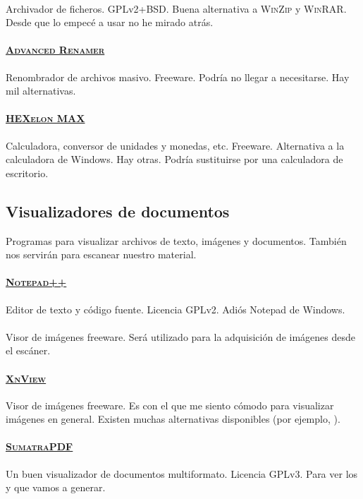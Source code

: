 \documentclass[%
	a5paper,
	10pt,
	twoside,
	openright,
	final,
]{memoir}
\begin{document}
	\paragraph{\href{https://www.7-zip.org}{\szip}} Archivador de ficheros. GPLv2+BSD. Buena alternativa a \textsc{WinZip} y \textsc{WinRAR}. Desde que lo empecé a usar no he mirado atrás.
	\paragraph{\href{https://www.advancedrenamer.com}{\textsc{Advanced Renamer}}} Renombrador de archivos masivo. Freeware. Podría no llegar a necesitarse. Hay mil alternativas.
	\paragraph{\href{https://www.hexelon.com/en}{\textsc{HEXelon MAX}}} Calculadora, conversor de unidades y monedas, etc. Freeware. Alternativa a la calculadora de Windows. Hay otras. Podría sustituirse por una calculadora de escritorio.

	\subsection{Visualizadores de documentos} Programas para visualizar archivos de texto, imágenes y documentos. También nos servirán para escanear nuestro material.
	\paragraph{\href{https://notepad-plus-plus.org}{\textsc{Notepad++}}} Editor de texto y código fuente. Licencia GPLv2. Adiós Notepad de Windows.
	\paragraph{\href{https://www.irfanview.com}{\irfanview}} Visor de imágenes freeware. Será utilizado para la adquisición de imágenes desde el escáner.
	\paragraph{\href{https://www.xnview.com/es/}{\textsc{XnView}}} Visor de imágenes freeware. Es con el que me siento cómodo para visualizar imágenes en general. Existen muchas alternativas disponibles (por ejemplo, \irfanview).
	\paragraph{\href{https://sumatrapdfreader.org}{\textsc{SumatraPDF}}} Un buen visualizador de documentos multiformato. Licencia GPLv3. Para ver los \pdf y \djvu que vamos a generar.
\end{document}
